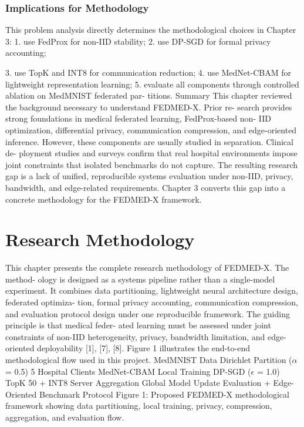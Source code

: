 \documentclass[12pt,a4paper]{report}
\begin{document}
\subsection{Implications for Methodology}
This problem analysis directly determines the methodological choices in Chapter 3:
1. use FedProx for non-IID stability; 2. use DP-SGD for formal privacy accounting;

3. use TopK and INT8 for communication reduction; 4. use MedNet-CBAM for lightweight representation learning; 5. evaluate all components through controlled ablation on MedMNIST federated par- titions.
Summary
This chapter reviewed the background necessary to understand FEDMED-X. Prior re- search provides strong foundations in medical federated learning, FedProx-based non-
IID optimization, differential privacy, communication compression, and edge-oriented inference. However, these components are usually studied in separation. Clinical de- ployment studies and surveys confirm that real hospital environments impose joint constraints that isolated benchmarks do not capture. The resulting research gap is a lack of unified, reproducible systems evaluation under non-IID, privacy, bandwidth, and edge-related requirements. Chapter 3 converts this gap into a concrete methodology for the FEDMED-X framework.

\chapter{Research Methodology}
This chapter presents the complete research methodology of FEDMED-X. The method- ology is designed as a systems pipeline rather than a single-model experiment.
It combines data partitioning, lightweight neural architecture design, federated optimiza- tion, formal privacy accounting, communication compression, and evaluation protocol design under one reproducible framework. The guiding principle is that medical feder- ated learning must be assessed under joint constraints of non-IID heterogeneity, privacy, bandwidth limitation, and edge-oriented deployability [1], [7], [8].
Figure 1 illustrates the end-to-end methodological flow used in this project.
MedMNIST
Data
Dirichlet
Partition ($\alpha$ = 0.5) 5 Hospital
Clients
MedNet-CBAM
Local Training
DP-SGD ($\epsilon$ = 1.0)
TopK 50%
+ INT8
Server
Aggregation
Global Model
Update
Evaluation + Edge-Oriented
Benchmark Protocol
Figure 1: Proposed FEDMED-X methodological framework showing data partitioning, local training, privacy, compression, aggregation, and evaluation flow.
\end{document}
